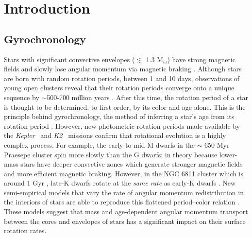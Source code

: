 \documentclass{aastex63}
\newcommand{\eg}{{\it e.g.}}
\newcommand{\kepler}{{\it Kepler}}
\newcommand{\Ktwo}{{\it K2}}
\newcommand{\ktwo}{\Ktwo}
\begin{document}

\section{Introduction}

\subsection{Gyrochronology}

Stars with significant convective envelopes ($\lesssim$ 1.3 M$_\odot$) have
strong magnetic fields and slowly lose angular momentum via magnetic braking
\citep[\eg][]{schatzman1962, weber1967, kraft1967, skumanich1972, kawaler1988,
pinsonneault1989}.
Although stars are born with random rotation periods, between 1 and 10 days,
observations of young open clusters reveal that their rotation periods
converge onto a unique sequence by $\sim$500-700 million years
\citep[\eg][]{irwin2009, gallet2013}.
After this time, the rotation period of a star is thought to be determined, to
first order, by its color and age alone.
This is the principle behind gyrochronology, the method of inferring a star’s
age from its rotation period \citep[\eg][]{skumanich1972, barnes2003,
barnes2007, mamajek2008, barnes2010, meibom2011, meibom2015}.
However, new photometric rotation periods made available by the \kepler\
\citep{borucki2010} and \ktwo\ \citep{howell2014} missions
\citep[\eg][]{mcquillan2014, garcia2014, douglas2017, rebull2017, meibom2011,
meibom2015, curtis2019} confirm that rotational evolution is a highly complex
process.
For example, the early-to-mid M dwarfs in the $\sim$ 650 Myr Praesepe cluster
spin more slowly than the G dwarfs; in theory because lower-mass stars have
deeper convective zones which generate stronger magnetic fields and more
efficient magnetic braking.
However, in the NGC 6811 cluster which is around 1 Gyr \citep{janes2011,
sandquist2016},
late-K dwarfs rotate at the {\it same rate} as early-K dwarfs
\citep{curtis2019}.
New semi-empirical models that vary the rate of angular momentum
redistribution in the interiors of stars are able to reproduce this flattened
period--color relation \citep{spada2019}.
These models suggest that mass and age-dependent angular momentum transport
between the cores and envelopes of stars has a significant impact on their
surface rotation rates.
\end{document}
